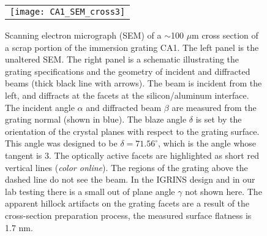 \documentclass[]{spie}
\begin{document}
   \begin{figure}
   \begin{center}
   \begin{tabular}{c}
   \texttt{[image: CA1\_SEM\_cross3]}
   \end{tabular}
   \end{center}
   \caption[CA1a SEM]{ \label{fig:CA1aSEM}  Scanning electron micrograph (SEM) of a $\sim$100 $\mu$m cross section of a scrap portion of the immersion grating CA1.  The left panel is the unaltered SEM.  The right panel is a schematic illustrating the grating specifications and the geometry of incident and diffracted beams (thick black line with arrows).  The beam is incident from the left, and diffracts at the facets at the silicon/aluminum interface.  The incident angle $\alpha$ and diffracted beam $\beta$ are measured from the grating normal (shown in blue).  The blaze angle $\delta$ is set by the orientation of the crystal planes with respect to the grating surface.  This angle was designed to be $\delta=71.56^\circ$, which is the angle whose tangent is 3.  The optically active facets are highlighted as short red vertical lines (\emph{color online}).  The regions of the grating above the dashed line do not see the beam.  In the IGRINS design and in our lab testing there is a small out of plane angle $\gamma$ not shown here.  The apparent hillock artifacts on the grating facets are a result of the cross-section preparation process, the measured\cite{wang2010} surface flatness is 1.7 nm.}
   \end{figure} 
\end{document}

